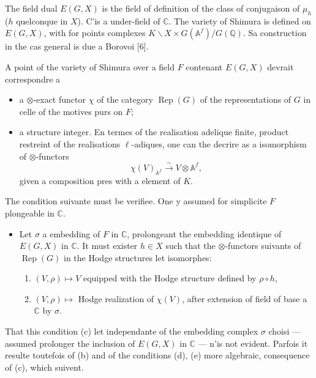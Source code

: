 \documentclass[11pt,a4paper]{article}
\theoremstyle{plain}
\theoremstyle{definition}
\DeclareMathOperator{\Rep}{Rep}
\newcommand{\Q}{\mathbb{Q}}
\newcommand{\C}{\mathbb{C}}
\newcommand{\Af}{\mathbb{A}^f}
\begin{document}
The field dual $E(G, X)$ is the field of definition of the class of conjugaison of $\mu_h$ ($h$ quelconque in $X$). C'is a under-field of $\C$. The variety of Shimura is defined on $E(G, X)$, with for points complexes $K \backslash X \times G(\Af) / G(\Q)$. Sa construction in the cas general is due a Borovoi [6].

A point of the variety of Shimura over a field $F$ contenant $E(G, X)$ devrait correspondre a

\begin{itemize}
\item[(a)] a $\otimes$-exact functor $\chi$ of the category $\Rep(G)$ of the representations of $G$ in celle of the motives purs on $F$;

\item[(b)] a structure integer. En termes of the realisation adelique finite, product restreint of the realisations $\ell$-adiques, one can the decrire as a isomorphism of $\otimes$-functors
$$
\chi(V)_{\Af} \xrightarrow{\sim} V \otimes \Af,
$$
given a composition pres with a element of $K$.
\end{itemize}

The condition suivante must be verifiee. One y assumed for simplicite $F$ plongeable in $\C$.

\begin{itemize}
\item[(c)] Let $\sigma$ a embedding of $F$ in $\C$, prolongeant the embedding identique of $E(G, X)$ in $\C$. It must exister $h \in X$ such that the $\otimes$-functors suivants of $\Rep(G)$ in the Hodge structures let isomorphes:
\begin{enumerate}
\item[(1)] $(V, \rho) \mapsto V$ equipped with the Hodge structure defined by $\rho \circ h$,
\item[(2)] $(V, \rho) \mapsto$ Hodge realization of $\chi(V)$, after extension of field of base a $\C$ by $\sigma$.
\end{enumerate}
\end{itemize}

That this condition (c) let independante of the embedding complex $\sigma$ choisi --- assumed prolonger the inclusion of $E(G, X)$ in $\C$ --- n'is not evident. Parfois it resulte toutefois of (b) and of the conditions (d), (e) more algebraic, consequence of (c), which suivent.
\end{document}
